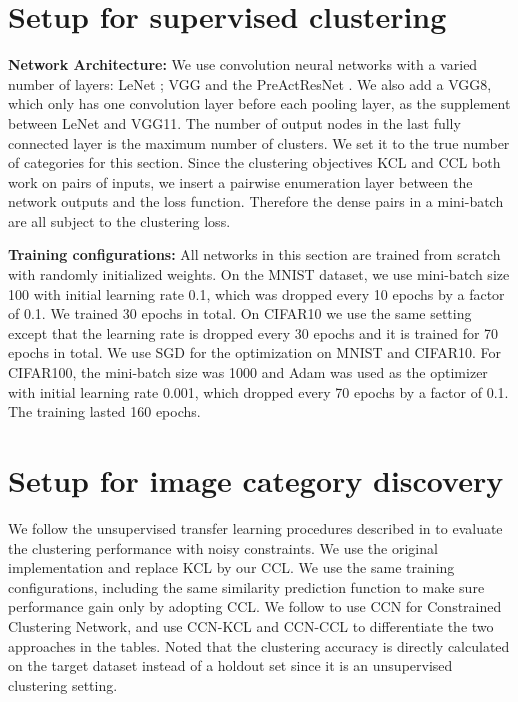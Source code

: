 \documentclass[10pt,twocolumn,letterpaper]{article}
\begin{document}
{\small


}

{\large{}}

\section{Setup for supervised clustering}
\textbf{Network Architecture:} We use convolution neural networks with a varied number of layers: LeNet \cite{lecun1998gradient}; VGG \cite{simonyan2014VGG} and the PreActResNet \cite{he2016identity}. We also add a VGG8, which only has one convolution layer before each pooling layer, as the supplement between LeNet and VGG11. The number of output nodes in the last fully connected layer is the maximum number of clusters. We set it to the true number of categories for this section. Since the clustering objectives KCL and CCL both work on pairs of inputs, we insert a pairwise enumeration layer \cite{Hsu18iclr} between the network outputs and the loss function. Therefore the dense pairs in a mini-batch are all subject to the clustering loss.

\textbf{Training configurations:} All networks in this section are trained from scratch with randomly initialized weights. On the MNIST dataset, we use mini-batch size 100 with initial learning rate 0.1, which was dropped every 10 epochs by a factor of 0.1. We trained 30 epochs in total. On CIFAR10 we use the same setting except that the learning rate is dropped every 30 epochs and it is trained for 70 epochs in total. We use SGD for the optimization on MNIST and CIFAR10. For CIFAR100, the mini-batch size was 1000 and Adam was used as the optimizer with initial learning rate 0.001, which dropped every 70 epochs by a factor of 0.1. The training lasted 160 epochs.

\section{Setup for image category discovery}
We follow the unsupervised transfer learning procedures described in \cite{Hsu18iclr} to evaluate the clustering performance with noisy constraints. We use the original implementation and replace KCL by our CCL. We use the same training configurations, including the same similarity prediction function to make sure performance gain only by adopting CCL.  We follow \cite{Hsu18iclr} to use CCN for Constrained Clustering Network, and use CCN-KCL and CCN-CCL to differentiate the two approaches in the tables. Noted that the clustering accuracy is directly calculated on the target dataset instead of a holdout set since it is an unsupervised clustering setting.
\end{document}
